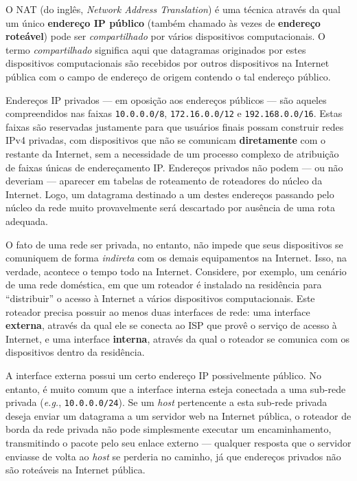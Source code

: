 \documentclass{article}
\begin{document}
O NAT (do inglês, \textit{Network Address Translation}) é uma técnica através da qual um único \textbf{endereço IP público} (também chamado às vezes de \textbf{endereço roteável}) pode ser \textit{compartilhado} por vários dispositivos computacionais. O termo \textit{compartilhado} significa aqui que datagramas originados por estes dispositivos computacionais são recebidos por outros dispositivos na Internet pública com o campo de endereço de origem contendo o tal endereço público.

Endereços IP privados --- em oposição aos endereços públicos --- são aqueles compreendidos nas faixas \texttt{10.0.0.0/8}, \texttt{172.16.0.0/12} e \texttt{192.168.0.0/16}. Estas faixas são reservadas justamente para que usuários finais possam construir redes IPv4 privadas, com dispositivos que não se comunicam \textbf{diretamente} com o restante da Internet, sem a necessidade de um processo complexo de atribuição de faixas únicas de endereçamento IP. Endereços privados não podem --- ou não deveriam --- aparecer em tabelas de roteamento de roteadores do núcleo da Internet. Logo, um datagrama destinado a um destes endereços passando pelo núcleo da rede muito provavelmente será descartado por ausência de uma rota adequada.

O fato de uma rede ser privada, no entanto, não impede que seus dispositivos se comuniquem de forma \textit{indireta} com os demais equipamentos na Internet. Isso, na verdade, acontece o tempo todo na Internet. Considere, por exemplo, um cenário de uma rede doméstica, em que um roteador é instalado na residência para ``distribuir'' o acesso à Internet a vários dispositivos computacionais. Este roteador precisa possuir ao menos duas interfaces de rede: uma interface \textbf{externa}, através da qual ele se conecta ao ISP que provê o serviço de acesso à Internet, e uma interface \textbf{interna}, através da qual o roteador se comunica com os dispositivos dentro da residência.

A interface externa possui um certo endereço IP possivelmente público. No entanto, é muito comum que a interface interna esteja conectada a uma sub-rede privada (\textit{e.g.}, \texttt{10.0.0.0/24}). Se um \textit{host} pertencente a esta sub-rede privada deseja enviar um datagrama a um servidor web na Internet pública, o roteador de borda da rede privada não pode simplesmente executar um encaminhamento, transmitindo o pacote pelo seu enlace externo --- qualquer resposta que o servidor enviasse de volta ao \textit{host} se perderia no caminho, já que endereços privados não são roteáveis na Internet pública.
\end{document}
